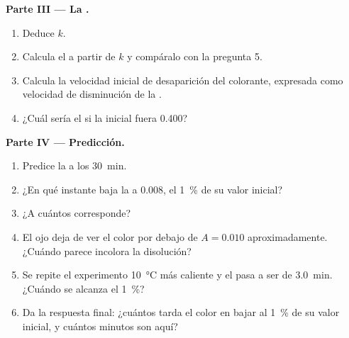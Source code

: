 \begin{problem}
\medskip
\noindent\textbf{Parte III --- La .}
\begin{enumerate}[resume]
  \item Deduce $k$.
  \item Calcula el  a partir de $k$ y compáralo
        con la pregunta 5.
  \item Calcula la velocidad inicial de desaparición del colorante,
        expresada como velocidad de disminución de la .
  \item ¿Cuál sería el  si la  inicial
        fuera 0.400?
\end{enumerate}

\medskip
\noindent\textbf{Parte IV --- Predicción.}
\begin{enumerate}[resume]
  \item Predice la  a los \qty{30}{min}.
  \item ¿En qué instante baja la  a 0.008, el \qty{1}{\percent}
        de su valor inicial?
  \item ¿A cuántos  corresponde?
  \item El ojo deja de ver el color por debajo de $A = 0.010$
        aproximadamente. ¿Cuándo parece incolora la disolución?
  \item Se repite el experimento \qty{10}{\celsius} más caliente y el
         pasa a ser de \qty{3.0}{min}. ¿Cuándo se
        alcanza el \qty{1}{\percent}?
  \item Da la respuesta final: ¿cuántos  tarda
        el color en bajar al \qty{1}{\percent} de su valor inicial, y
        cuántos minutos son aquí?
\end{enumerate}
\end{problem}
